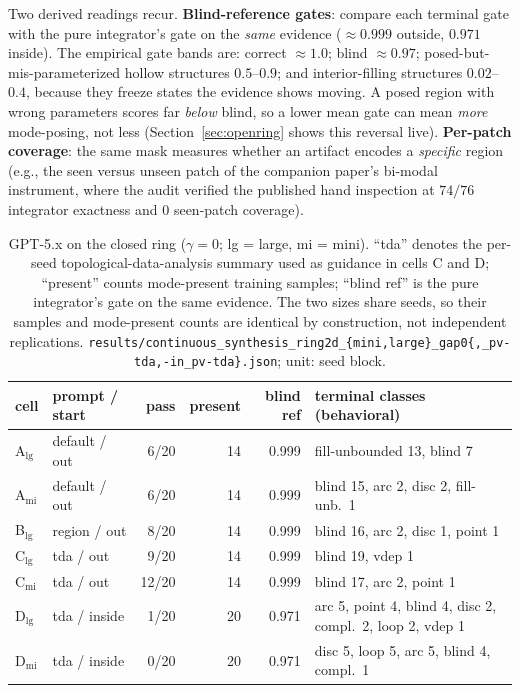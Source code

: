 \documentclass[11pt]{article}
\theoremstyle{remark}
\begin{document}
Two derived readings recur. \textbf{Blind-reference gates}: compare each
terminal gate with the pure integrator's gate on the \emph{same}
evidence (${\approx}0.999$ outside, $0.971$ inside). The empirical gate
bands are: correct ${\approx}1.0$; blind ${\approx}0.97$; posed-but-%
mis-parameterized hollow structures $0.5$--$0.9$; and interior-filling
structures $0.02$--$0.4$, because they freeze states the evidence shows
moving. A posed region with wrong parameters scores far \emph{below}
blind, so a lower mean gate can mean \emph{more} mode-posing, not less
(Section~\ref{sec:openring} shows this reversal live). \textbf{Per-patch
coverage}: the same mask measures whether an artifact encodes a
\emph{specific} region (e.g., the seen versus unseen patch of the companion
paper's bi-modal instrument, where the audit verified the published hand
inspection at $74/76$ integrator exactness and $0$ seen-patch coverage).

\begin{table}[h]
\centering
\footnotesize
\begin{tabular}{llrrrl}
\toprule
cell & prompt / start & pass & present & blind ref & terminal classes (behavioral) \\
\midrule
A$_{\mathrm{lg}}$ & default / out & 6/20 & 14 & 0.999 & fill-unbounded 13, blind 7 \\
A$_{\mathrm{mi}}$ & default / out & 6/20 & 14 & 0.999 & blind 15, arc 2, disc 2, fill-unb.\ 1 \\
B$_{\mathrm{lg}}$ & region / out  & 8/20 & 14 & 0.999 & blind 16, arc 2, disc 1, point 1 \\
C$_{\mathrm{lg}}$ & tda / out     & 9/20 & 14 & 0.999 & blind 19, vdep 1 \\
C$_{\mathrm{mi}}$ & tda / out     & 12/20 & 14 & 0.999 & blind 17, arc 2, point 1 \\
D$_{\mathrm{lg}}$ & tda / inside  & 1/20 & 20 & 0.971 & arc 5, point 4, blind 4, disc 2, compl.\ 2, loop 2, vdep 1 \\
D$_{\mathrm{mi}}$ & tda / inside  & 0/20 & 20 & 0.971 & disc 5, loop 5, arc 5, blind 4, compl.\ 1 \\
\bottomrule
\end{tabular}
\caption{GPT-5.x on the closed ring ($\gamma = 0$; lg = large, mi =
mini). ``tda'' denotes the per-seed topological-data-analysis summary
used as guidance in cells C and D; ``present'' counts mode-present
training samples; ``blind ref'' is the pure integrator's gate on the
same evidence. The two sizes share seeds, so their samples and
mode-present counts are identical by construction, not independent
replications.
\texttt{results/continuous\_synthesis\_ring2d\_\{mini,large\}\_gap0\{,\_pv-tda,-in\_pv-tda\}.json};
unit: seed block.}
\label{tab:closedring}
\end{table}
\end{document}
